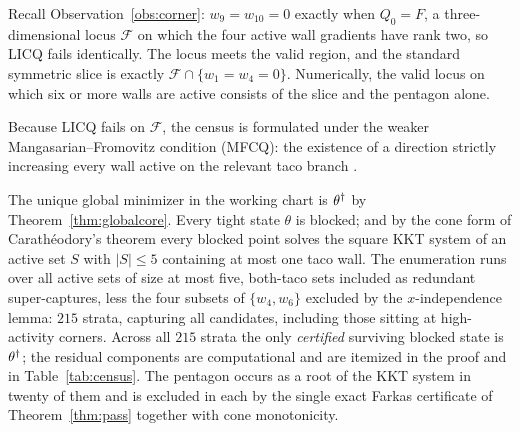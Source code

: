 Recall Observation~\ref{obs:corner}: $w_9=w_{10}=0$ exactly when $Q_0=F$, a three-dimensional locus $\mathcal F$ on which the four active wall gradients have rank two, so LICQ fails identically. The locus meets the valid region, and the standard symmetric slice is exactly $\mathcal F\cap\{w_1=w_4=0\}$. Numerically, the valid locus on which six or more walls are active consists of the slice and the pentagon alone.

Because LICQ fails on $\mathcal F$, the census is formulated under the weaker Mangasarian--Fromovitz condition (MFCQ): the existence of a direction strictly increasing every wall active on the relevant taco branch \cite{nocedal2006}.

\begin{theorem}\label{thm:census}
The unique global minimizer in the working chart is $\theta^\dagger$ by Theorem~\ref{thm:globalcore}. Every tight state $\theta$ is blocked; and by the cone form of Carath\'eodory's theorem every blocked point solves the square KKT system of an active set $S$ with $|S|\le5$ containing at most one taco wall. The enumeration runs over all active sets of size at most five, both-taco sets included as redundant super-captures, less the four subsets of $\{w_4,w_6\}$ excluded by the $x$-independence lemma: $215$ strata, capturing all candidates, including those sitting at high-activity corners. Across all $215$ strata the only \emph{certified} surviving blocked state is $\theta^\dagger$; the residual components are computational and are itemized in the proof and in Table~\ref{tab:census}. The pentagon occurs as a root of the KKT system in twenty of them and is excluded in each by the single exact Farkas certificate of Theorem~\textup{\ref{thm:pass}} together with cone monotonicity.
\end{theorem}

